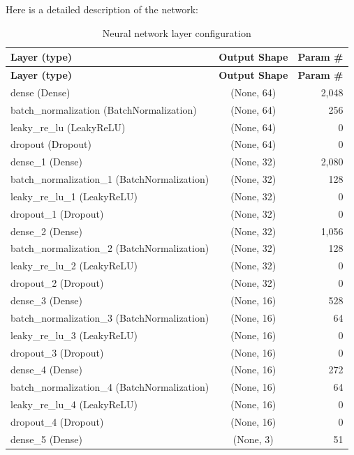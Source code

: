 \documentclass[rgb,listoffigures,listoftables,final]{cam-thesis}
\begin{document}
    Here is a detailed description of the network:
    \begin{center}
    \renewcommand{\arraystretch}{1.2}
    \begin{longtable}{|l|c|r|}
      \caption{Neural network layer configuration}
      \label{tab:nn_layers} \\
      \hline
      \textbf{Layer (type)} & \textbf{Output Shape} & \textbf{Param \#} \\
      \hline
      \endfirsthead
    
      \hline
      \textbf{Layer (type)} & \textbf{Output Shape} & \textbf{Param \#} \\
      \hline
      \endhead
    
      \hline
      \endfoot
    
      \hline
      \endlastfoot
    
      dense (Dense) & (None, 64) & 2,048 \\
      batch\_normalization (BatchNormalization) & (None, 64) & 256 \\
      leaky\_re\_lu (LeakyReLU) & (None, 64) & 0 \\
      dropout (Dropout) & (None, 64) & 0 \\
      dense\_1 (Dense) & (None, 32) & 2,080 \\
      batch\_normalization\_1 (BatchNormalization) & (None, 32) & 128 \\
      leaky\_re\_lu\_1 (LeakyReLU) & (None, 32) & 0 \\
      dropout\_1 (Dropout) & (None, 32) & 0 \\
      dense\_2 (Dense) & (None, 32) & 1,056 \\
      batch\_normalization\_2 (BatchNormalization) & (None, 32) & 128 \\
      leaky\_re\_lu\_2 (LeakyReLU) & (None, 32) & 0 \\
      dropout\_2 (Dropout) & (None, 32) & 0 \\
      dense\_3 (Dense) & (None, 16) & 528 \\
      batch\_normalization\_3 (BatchNormalization) & (None, 16) & 64 \\
      leaky\_re\_lu\_3 (LeakyReLU) & (None, 16) & 0 \\
      dropout\_3 (Dropout) & (None, 16) & 0 \\
      dense\_4 (Dense) & (None, 16) & 272 \\
      batch\_normalization\_4 (BatchNormalization) & (None, 16) & 64 \\
      leaky\_re\_lu\_4 (LeakyReLU) & (None, 16) & 0 \\
      dropout\_4 (Dropout) & (None, 16) & 0 \\
      dense\_5 (Dense) & (None, 3) & 51 \\
    \end{longtable}
    \end{center}
\end{document}
